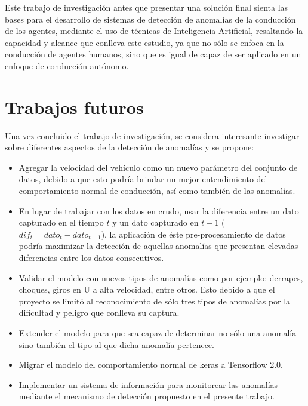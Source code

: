 Este trabajo de investigaci\'{o}n antes que presentar una soluci\'{o}n final sienta las bases para el desarrollo de sistemas de detecci\'{o}n de anomal\'{i}as de la conducci\'{o}n de los agentes, mediante el uso de t\'{e}cnicas de Inteligencia Artificial, resaltando la capacidad y alcance que conlleva este estudio, ya que no s\'{o}lo se enfoca en la conducci\'{o}n de agentes humanos, sino que es igual de capaz de ser aplicado en un enfoque de conducci\'{o}n aut\'{o}nomo.

\section{Trabajos futuros}

Una vez concluido el trabajo de investigaci\'{o}n, se considera interesante investigar sobre diferentes aspectos de la detecci\'{o}n de anomal\'{i}as y se propone:

\begin{itemize}
\item Agregar la velocidad del veh\'{i}culo como un nuevo par\'{a}metro del conjunto de datos, debido a que esto podr\'{i}a brindar un mejor entendimiento del comportamiento normal de conducci\'{o}n, as\'{i} como tambi\'{e}n de las anomal\'{i}as.
\item En lugar de trabajar con los datos en crudo, usar la diferencia entre un dato capturado en el tiempo $t$ y un dato capturado en $t-1$ ($dif_{t} = dato_{t}-dato_{t-1}$), la aplicaci\'{o}n de \'{e}ste pre-procesamiento de datos podr\'{i}a maximizar la detecci\'{o}n de aquellas anomal\'{i}as que presentan elevadas diferencias entre los datos consecutivos.
\item Validar el modelo con nuevos tipos de anomal\'{i}as como por ejemplo: derrapes, choques, giros en U a alta velocidad, entre otros. Esto debido a que el proyecto se limit\'{o} al reconocimiento de s\'{o}lo tres tipos de anomal\'{i}as por la dificultad y peligro que conlleva su captura.
\item Extender el modelo para que sea capaz de determinar no s\'{o}lo una anomal\'{i}a sino tambi\'{e}n el tipo al que dicha anomal\'{i}a pertenece.
\item Migrar el modelo del comportamiento normal de keras a Tensorflow 2.0.
\item Implementar un sistema de informaci\'{o}n para monitorear las anomal\'{i}as mediante el mecanismo de detecci\'{o}n propuesto en el presente trabajo.

\end{itemize}

 

